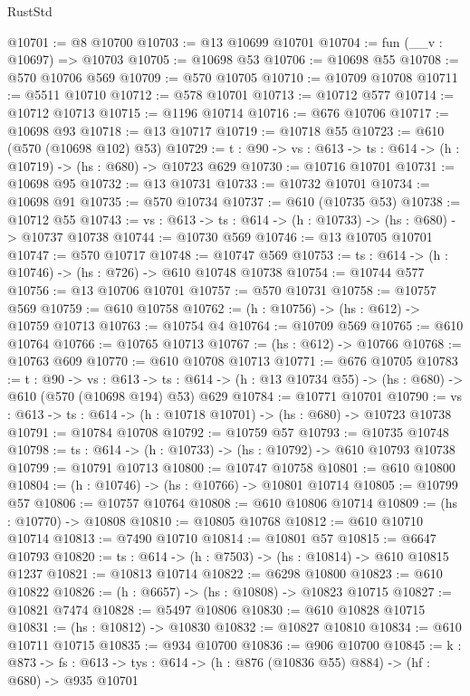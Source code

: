 \begin{lexlean}{RustStd}
\begin{coremodule}
@10701 := @8 @10700
@10703 := @13 @10699 @10701
@10704 := fun (__v : @10697) => @10703
@10705 := @10698 @53
@10706 := @10698 @55
@10708 := @570 @10706 @569
@10709 := @570 @10705
@10710 := @10709 @10708
@10711 := @5511 @10710
@10712 := @578 @10701
@10713 := @10712 @577
@10714 := @10712 @10713
@10715 := @1196 @10714
@10716 := @676 @10706
@10717 := @10698 @93
@10718 := @13 @10717
@10719 := @10718 @55
@10723 := @610 (@570 (@10698 @102) @53)
@10729 := {t : @90} -> {vs : @613} -> {ts : @614} -> (h : @10719) -> (hs : @680) -> @10723 @629
@10730 := @10716 @10701
@10731 := @10698 @95
@10732 := @13 @10731
@10733 := @10732 @10701
@10734 := @10698 @91
@10735 := @570 @10734
@10737 := @610 (@10735 @53)
@10738 := @10712 @55
@10743 := {vs : @613} -> {ts : @614} -> (h : @10733) -> (hs : @680) -> @10737 @10738
@10744 := @10730 @569
@10746 := @13 @10705 @10701
@10747 := @570 @10717
@10748 := @10747 @569
@10753 := {ts : @614} -> (h : @10746) -> (hs : @726) -> @610 @10748 @10738
@10754 := @10744 @577
@10756 := @13 @10706 @10701
@10757 := @570 @10731
@10758 := @10757 @569
@10759 := @610 @10758
@10762 := (h : @10756) -> (hs : @612) -> @10759 @10713
@10763 := @10754 @4
@10764 := @10709 @569
@10765 := @610 @10764
@10766 := @10765 @10713
@10767 := (hs : @612) -> @10766
@10768 := @10763 @609
@10770 := @610 @10708 @10713
@10771 := @676 @10705
@10783 := {t : @90} ->
  {vs : @613} ->
  {ts : @614} -> (h : @13 @10734 @55) -> (hs : @680) -> @610 (@570 (@10698 @194) @53) @629
@10784 := @10771 @10701
@10790 := {vs : @613} -> {ts : @614} -> (h : @10718 @10701) -> (hs : @680) -> @10723 @10738
@10791 := @10784 @10708
@10792 := @10759 @57
@10793 := @10735 @10748
@10798 := {ts : @614} -> (h : @10733) -> (hs : @10792) -> @610 @10793 @10738
@10799 := @10791 @10713
@10800 := @10747 @10758
@10801 := @610 @10800
@10804 := (h : @10746) -> (hs : @10766) -> @10801 @10714
@10805 := @10799 @57
@10806 := @10757 @10764
@10808 := @610 @10806 @10714
@10809 := (hs : @10770) -> @10808
@10810 := @10805 @10768
@10812 := @610 @10710 @10714
@10813 := @7490 @10710
@10814 := @10801 @57
@10815 := @6647 @10793
@10820 := {ts : @614} -> (h : @7503) -> (hs : @10814) -> @610 @10815 @1237
@10821 := @10813 @10714
@10822 := @6298 @10800
@10823 := @610 @10822
@10826 := (h : @6657) -> (hs : @10808) -> @10823 @10715
@10827 := @10821 @7474
@10828 := @5497 @10806
@10830 := @610 @10828 @10715
@10831 := (hs : @10812) -> @10830
@10832 := @10827 @10810
@10834 := @610 @10711 @10715
@10835 := @934 @10700
@10836 := @906 @10700
@10845 := {k : @873} ->
  {fs : @613} -> {tys : @614} -> (h : @876 (@10836 @55) @884) -> (hf : @680) -> @935 @10701

\end{coremodule}
\end{lexlean}
